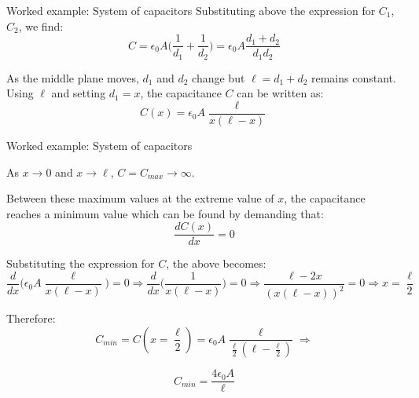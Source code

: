 {\begin{frame}{Worked example: System of capacitors}
  Substituting above the expression for $C_1$, $C_2$, we find:
  \begin{equation*}
    C = \epsilon_0 A \Big(\frac{1}{d_1} + \frac{1}{d_2}\Big)
      = \epsilon_0 A \frac{d_1 + d_2}{d_1 d_2}
  \end{equation*}

  As the middle plane moves, $d_1$ and $d_2$ change but
  $\ell = d_1 + d_2$ remains constant.
  Using $\ell$ and setting $d_1 = x$,
  the capacitance $C$ can be written as:
  \begin{equation*}
    C(x) = \epsilon_0 A \frac{\ell}{x (\ell-x)}
  \end{equation*}

\end{frame}

%
%
%

\begin{frame}{Worked example: System of capacitors}

  As $x \rightarrow 0$ and $x \rightarrow \ell$, $C = C_{max} \rightarrow \infty$.

  Between these maximum values at the extreme value of $x$, the capacitance
  reaches a minimum value which can be found by demanding that:
  \begin{equation*}
    \frac{dC(x)}{dx} = 0
  \end{equation*}

  Substituting the expression for $C$, the above becomes:
  \begin{equation*}
    \frac{d}{dx} \Big( \epsilon_0 A \frac{\ell}{x (\ell-x)} \Big) = 0 \Rightarrow
    \frac{d}{dx} \Big( \frac{1}{x (\ell-x)} \Big) = 0 \Rightarrow
    \frac{\ell - 2x}{(x(\ell-x))^2} = 0 \Rightarrow x = \frac{\ell}{2}
  \end{equation*}

  Therefore:
  \begin{equation*}
    C_{min} = C(x=\frac{\ell}{2}) =
      \epsilon_0 A \frac{\ell}{\frac{\ell}{2}(\ell-\frac{\ell}{2})} \Rightarrow
  \end{equation*}

  \begin{equation*}
    C_{min} = \frac{4 \epsilon_0 A}{\ell}
  \end{equation*}

\end{frame}


} %
